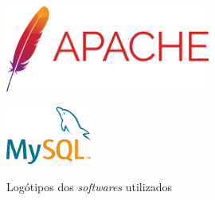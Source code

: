 \documentclass[11pt,twoside,a4paper]{report}
\begin{document}
\begin{figure}[H]
\begin{minipage}{0.33\textwidth}
\begin{center}
			\label{fig:gcc}
		\end{center}
	\end{minipage}%
	\begin{minipage}{0.33\textwidth}
		\vspace{1.1cm}
		\begin{center}
			\includegraphics[width=0.6\textwidth]{apache} %
			\label{fig:apache}
		\end{center}
	\end{minipage}
	\begin{minipage}{1\textwidth}
		\vspace{0.5cm}
		\begin{center}
			\includegraphics[width=0.25\textwidth]{mysql} %
			\label{fig:mysql}
		\end{center}
	\end{minipage}
	\caption{Logótipos dos \textit{softwares} utilizados}
	\label{fig:softwares}
\end{figure}
\end{document}
